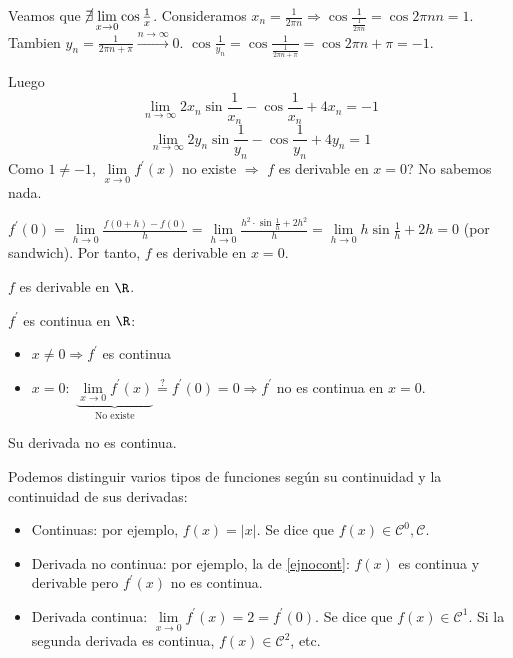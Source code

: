 \begin{example}
\begin{enumerate}
		      Veamos que \(\cancel\exists \lim\limits_{x  \to 0 } \cos \frac{1}{x }\). Consideramos \(x_n = \frac{1}{2\pi n} \Rightarrow \cos \frac{1}{\frac{1}{2\pi n }} = \cos  2\pi n n = 1 \). Tambien \(y_n = \frac{1}{2\pi n + \pi } \overset{n \rightarrow \infty}{\longrightarrow} 0 \). \(\cos \frac{1}{y_n} = \cos \frac{1}{\frac{1}{2\pi n + \pi}} = \cos 2\pi n + \pi = -1\).
		      
		      Luego
		      \[
			      \lim\limits_{n  \to \infty} 2x_n \sin \frac{1}{x_n} - \cos \frac{1}{x_n} + 4x_n = -1
		      \]
		      \[
			      \lim\limits_{n \to \infty} 2y_n \sin \frac{1}{y_n} - \cos \frac{1}{y_n} + 4y_n = 1
		      \]
		      Como \(1 \neq  -1 \), \(\lim\limits_{x  \to 0 } f^\prime (x)\) no existe \(\Rightarrow \) \(f \) es derivable en \(x = 0 \)? No sabemos nada.
		      
		      \(f^\prime (0) = \lim\limits_{h  \to 0} \frac{f(0 + h) - f(0 )}{h } = \lim\limits_{h  \to 0 } \frac{h^{2 } \cdot \sin \frac{1}{h} + 2h^{2}  }{h} = \lim\limits_{h  \to 0 } h \sin \frac{1}{h} + 2h = 0\) (por sandwich). Por tanto, \(f \) es derivable en \(x = 0 \).
		      
		      \(f \) es derivable en \(\R \).
		      
		      \vspace{0.2cm}
		      \(f^\prime \) es continua en \(\R \):
		      \begin{itemize}
			      \item \(x \neq 0 \Rightarrow f^\prime \) es continua
			      \item \(x = 0:\) \(\underbrace{\lim\limits_{x  \to 0 } f^\prime (x)}_{\text{No existe} } \overset{?}{=} f^\prime (0) = 0 \Rightarrow f^\prime \) no es continua en \(x = 0\).
		      \end{itemize}
		      Su derivada no es continua.
	\end{enumerate}
\end{example}
Podemos distinguir varios tipos de funciones según su continuidad y la continuidad de sus derivadas:
\begin{itemize}
	\item Continuas: por ejemplo, \(f(x) = \left\vert x  \right\vert \). Se dice que \(f(x) \in \mathscr{C}^{0}, \mathscr{C} \).
	\item Derivada no continua: por ejemplo, la de \ref{ejnocont}: \(f(x )\) es continua y derivable pero \(f^\prime (x)\) no es continua.
	\item Derivada continua: \(\lim\limits_{x  \to 0 } f^\prime (x) = 2  = f^\prime (0)\). Se dice que \(f(x) \in \mathscr{C}^{1} \). Si la segunda derivada es continua, \(f(x) \in \mathscr{C}^{2} \), etc.
\end{itemize}

